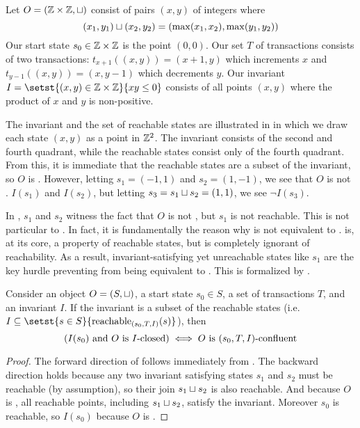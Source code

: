 \begin{example}
  Let $O = (\mathbb{Z} \times \mathbb{Z}, \sqcup)$ consist of pairs $(x, y)$ of integers
  where
  \[
    \hfill (x_1, y_1) \join (x_2, y_2) = (\max(x_1, x_2), \max(y_1, y_2)) \hfill
  \]
  Our start state $s_0 \in \mathbb{Z} \times \mathbb{Z}$ is the point $(0, 0)$. Our set
  $T$ of transactions consists of two transactions: $t_{x+1}((x, y)) = (x + 1,
  y)$ which increments $x$ and $t_{y-1}((x, y)) = (x, y - 1)$ which decrements
  $y$.  Our invariant $I = \setst{(x, y) \in \ints \times \ints}{xy \leq 0}$
  consists of all points $(x, y)$ where the product of $x$ and $y$ is
  non-positive.

  The invariant and the set of reachable states are illustrated in 
  in which we draw each state $(x, y)$ as a point in $\mathbb{Z}^2$. The invariant
  consists of the second and fourth quadrant, while the reachable states consist only
  of the fourth quadrant. From this, it is immediate that the reachable states
  are a subset of the invariant, so $O$ is \invariantconfluent{}. However,
  letting $s_1 = (-1, 1)$ and $s_2 = (1, -1)$, we see that $O$ is not
  \invariantclosed{}. $I(s_1)$ and $I(s_2)$, but letting $s_3 = s_1 \sqcup s_2 =
  (1, 1)$, we see $\lnot I(s_3)$.
\end{example}

In , $s_1$ and $s_2$ witness the fact that $O$ is not
\invariantclosed{}, but $s_1$ is not reachable. This is not particular to
. In fact, it is fundamentally the reason why
\invariantclosure{} is not equivalent to \invariantconfluence{}.
\Invariantconfluence{} is, at its core, a property of reachable states, but
\invariantclosure{} is completely ignorant of reachability. As a result,
invariant-satisfying yet unreachable states like $s_1$ are the key hurdle
preventing \invariantclosure{} from being equivalent to \invariantconfluence{}.
This is formalized by .

\begin{theorem}
  Consider an object $O = (S, \sqcup)$, a start state $s_0 \in S$, a set of
  transactions $T$, and an invariant $I$. If the invariant is a subset of the
  reachable states (i.e. $I \subseteq \setst{s \in
  S}{\sTIreachablepredicate{s}}$), then
  \[
    (\text{$I(s_0)$ and $O$ is $I$-closed{}}) \iff \text{$O$ is $(s_0, T, I)$-confluent{}}
  \]
\end{theorem}

\begin{proof}
  The forward direction of  follows
  immediately from . The backward direction
  holds because any two invariant satisfying states $s_1$ and $s_2$ must be
  reachable (by assumption), so their join $s_1 \sqcup s_2$ is also reachable.
  And because $O$ is \sTIconfluent{}, all reachable points, including $s_1
  \sqcup s_2$, satisfy the invariant. Moreover $s_0$ is reachable, so $I(s_0)$
  because $O$ is \sTIconfluent{}.
\end{proof}
